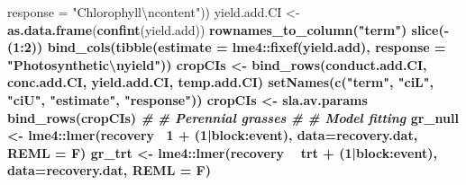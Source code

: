 \documentclass[]{scrartcl}
\newenvironment{Shaded}{\begin{snugshade}}{\end{snugshade}}
\newcommand{\CharTok}[1]{\textcolor[rgb]{0.31,0.60,0.02}{#1}}
\newcommand{\CommentTok}[1]{\textcolor[rgb]{0.56,0.35,0.01}{\textit{#1}}}
\newcommand{\DataTypeTok}[1]{\textcolor[rgb]{0.13,0.29,0.53}{#1}}
\newcommand{\DecValTok}[1]{\textcolor[rgb]{0.00,0.00,0.81}{#1}}
\newcommand{\KeywordTok}[1]{\textcolor[rgb]{0.13,0.29,0.53}{\textbf{#1}}}
\newcommand{\NormalTok}[1]{#1}
\newcommand{\OperatorTok}[1]{\textcolor[rgb]{0.81,0.36,0.00}{\textbf{#1}}}
\newcommand{\StringTok}[1]{\textcolor[rgb]{0.31,0.60,0.02}{#1}}
\begin{document}
\begin{Shaded}
\begin{Highlighting}[]
{{{{{{{{{{{{{{{{{{{{{{{{{{{{{{{{{{{{{{{                                  \DataTypeTok{response =} \StringTok{"Chlorophyll}\CharTok{\textbackslash{}n}\StringTok{content"}\NormalTok{))}
\NormalTok{  yield.add.CI <-}\StringTok{ }\KeywordTok{as.data.frame}\NormalTok{(}\KeywordTok{confint}\NormalTok{(yield.add)) }\OperatorTok{%
\StringTok{                      }\KeywordTok{rownames_to_column}\NormalTok{(}\StringTok{"term"}\NormalTok{) }\OperatorTok{%
\StringTok{                        }\KeywordTok{slice}\NormalTok{(}\OperatorTok{-}\NormalTok{(}\DecValTok{1}\OperatorTok{:}\DecValTok{2}\NormalTok{)) }\OperatorTok{%
\StringTok{                 }\KeywordTok{bind_cols}\NormalTok{(}\KeywordTok{tibble}\NormalTok{(}\DataTypeTok{estimate =}\NormalTok{ lme4}\OperatorTok{::}\KeywordTok{fixef}\NormalTok{(yield.add), }
                                  \DataTypeTok{response =} \StringTok{"Photosynthetic}\CharTok{\textbackslash{}n}\StringTok{yield"}\NormalTok{))}  
\NormalTok{ cropCIs <-}\StringTok{ }\KeywordTok{bind_rows}\NormalTok{(conduct.add.CI, }
\NormalTok{                      conc.add.CI, }
\NormalTok{                      yield.add.CI, }
\NormalTok{                      temp.add.CI) }\OperatorTok{%
\StringTok{              }\KeywordTok{setNames}\NormalTok{(}\KeywordTok{c}\NormalTok{(}\StringTok{"term"}\NormalTok{, }\StringTok{"ciL"}\NormalTok{, }\StringTok{"ciU"}\NormalTok{, }
                         \StringTok{"estimate"}\NormalTok{, }\StringTok{"response"}\NormalTok{))}  
\NormalTok{  cropCIs <-}\StringTok{ }
\StringTok{     }\NormalTok{sla.av.params }\OperatorTok{%
\StringTok{        }\KeywordTok{bind_rows}\NormalTok{(cropCIs)}
\CommentTok{#}
\CommentTok{# Perennial grasses }
\CommentTok{#}
\CommentTok{# Model fitting}
\NormalTok{  gr_null <-}\StringTok{ }\NormalTok{lme4}\OperatorTok{::}\KeywordTok{lmer}\NormalTok{(recovery}\OperatorTok{~}\StringTok{ }\DecValTok{1} \OperatorTok{+}\StringTok{ }\NormalTok{(}\DecValTok{1}\OperatorTok{|}\NormalTok{block}\OperatorTok{:}\NormalTok{event), }
                           \DataTypeTok{data=}\NormalTok{recovery.dat, }\DataTypeTok{REML =}\NormalTok{ F) }
\NormalTok{  gr_trt <-}\StringTok{ }\NormalTok{lme4}\OperatorTok{::}\KeywordTok{lmer}\NormalTok{(recovery }\OperatorTok{~}\StringTok{ }\NormalTok{trt }\OperatorTok{+}\StringTok{ }\NormalTok{(}\DecValTok{1}\OperatorTok{|}\NormalTok{block}\OperatorTok{:}\NormalTok{event),}
                          \DataTypeTok{data=}\NormalTok{recovery.dat, }\DataTypeTok{REML =}\NormalTok{ F)}
}}}}}}}}}}}}}}}}}}}}}}}}}}}}}}}}}}}}}}}}}}}}
\end{Highlighting}
\end{Shaded}
\end{document}

